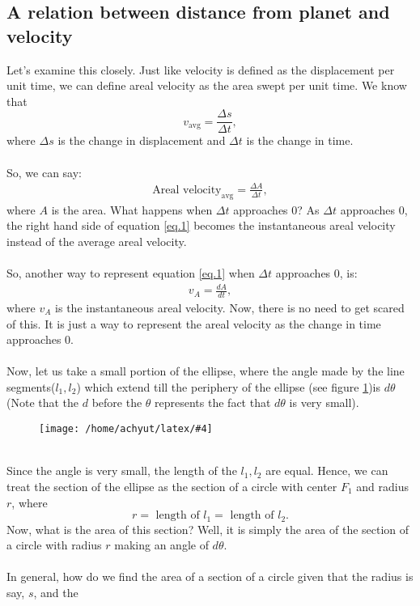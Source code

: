\documentclass[a4paper]{report}
\newcommand{\mkfig}[5]{
  \begin{figure}[#1]
    \centering
    \texttt{[image: /home/achyut/latex/\#4]}
    \caption{\centering{#5}}
    \label{fig.#2}
  \end{figure}
}
\begin{document}
\subsection{A relation between distance from planet and velocity}\label{sec.1}
Let's examine this closely. Just like velocity is defined as the displacement per unit time, we can define 
areal velocity as the area swept per unit time. We know that $$v_{\text{avg}}=\frac{\Delta s}{\Delta t},$$
where $\Delta s$ is the change in displacement and $\Delta t$ is the change in time. \\\\
So, we can say: 
\begin{align} \label{eq.1}
  \text{Areal velocity}_\text{avg} = \frac{\Delta A}{\Delta t},
\end{align}
where $A$ is the area.
What happens when $\Delta t$ approaches $0$? As $\Delta t$ approaches 0, the right hand side of equation \ref{eq.1}
becomes the instantaneous areal velocity instead of the average areal velocity. \\\\
So, another way to represent equation \ref{eq.1} when $\Delta t$ approaches 0, is: 
\begin{align} \label{eq.2}
  v_A=\frac{dA}{dt},
\end{align}
where $v_A$ is the instantaneous areal velocity. Now, there is no need to get scared of this. It is just a way
to represent the areal velocity as the change in time approaches 0. \\\\
Now, let us take a small portion of the ellipse, where the angle made by the line segments($l_1,l_2$) 
which extend till the periphery of the ellipse (see figure \ref{fig.3})is $d\theta$ (Note that the $d$ before the
$\theta$ represents the fact that $d\theta$ is very small). \\
\mkfig{h!}{3}{2}{presentation.3.png}{Section of ellipse} \\
Since the angle is very small, the length of the $l_1,l_2$ are equal. Hence, we can treat the section of the 
ellipse as the section of a circle with center $F_1$ and radius $r$, where 
$$r=\text{ length of }l_1=\text{ length of }l_2.$$
Now, what is the area of this section? Well, it is simply the area of the section of a circle with radius
$r$ making an angle of $d\theta$. \\
\\
In general, how do we find the area of a section of a circle given that the radius is say, $s$, and the 
\end{document}
